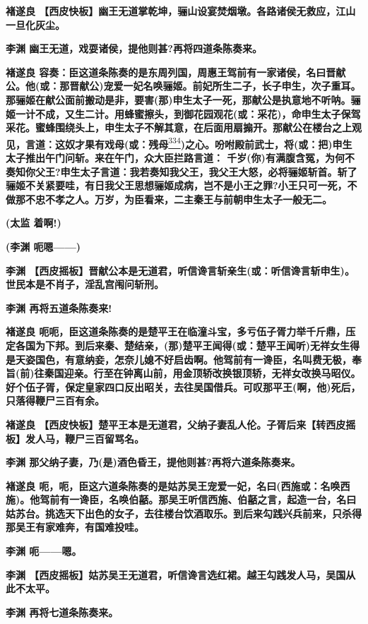 \textbf{褚遂良
【西皮快板】幽王无道掌乾坤，骊山设宴焚烟墩。各路诸侯无救应，江山一旦化灰尘。}

\textbf{李渊 幽王无道，戏耍诸侯，提他则甚?再将四道条陈奏来。}

\textbf{褚遂良
容奏：臣这道条陈奏的是东周列国，周惠王驾前有一家诸侯，名曰晋献公。他(或：那晋献公)宠爱一妃名唤骊姬。前妃所生二子，长子申生，次子重耳。那骊姬在献公面前搬动是非，要害(那)申生太子一死，那献公是执意地不听呐。骊姬一计不成，又生二计。用蜂蜜擦头，到御花园观花(或：采花)，命申生太子保驾采花。蜜蜂围绕头上，申生太子不解其意，在后面用扇搧开。那献公在楼台之上观见，言道：这奴才果有戏母(或：残母}\protect\hyperlink{fn334}{\textsuperscript{334}}\textbf{)之心。吩咐殿前武士，将(或：把)申生太子推出午门问斩。来在午门，众大臣拦路言道：
千岁(你)有满腹含冤，为何不奏知你父王?申生太子言道：我若奏知我父王，我父王大怒，必将骊姬斩首。斩了骊姬不关紧要哇，有日我父王思想骊姬成病，岂不是小王之罪?小王只可一死，不做那不忠不孝之人。万岁，为臣看来，二主秦王与前朝申生太子一般无二。}

\textbf{(太监 着啊!)}

\textbf{(李渊 呃嗯------)}

\textbf{李渊
【西皮摇板】晋献公本是无道君，听信谗言斩亲生(或：听信谗言斩申生)。世民本是不肖子，淫乱宫闱问斩刑。}

\textbf{李渊 再将五道条陈奏来!}

\textbf{褚遂良
呃呃，臣这道条陈奏的是楚平王在临潼斗宝，多亏伍子胥力举千斤鼎，压定各国为下邦。到后来秦、楚结亲，(那)楚平王闻得(或：楚平王闻听)无祥女生得是天姿国色，有意纳妾，怎奈儿媳不好启齿啊。他驾前有一谗臣，名叫费无极，奉旨(前)往秦国迎亲。行至在钟离山前，用金顶轿改换银顶轿，无祥女改换马昭仪。好个伍子胥，保定皇家四口反出昭关，去往吴国借兵。可叹那平王(啊，他)死后，只落得鞭尸三百有余。}

\textbf{褚遂良
【西皮快板】楚平王本是无道君，父纳子妻乱人伦。子胥后来【转西皮摇板】发人马，鞭尸三百留骂名。}

\textbf{李渊 那父纳子妻，乃(是)酒色昏王，提他则甚?再将六道条陈奏来。}

\textbf{褚遂良
呃，呃，臣这六道条陈奏的是姑苏吴王宠爱一妃，名曰(西施或：名唤西施)。他驾前有一谗臣，名唤伯嚭。那吴王听信西施、伯嚭之言，起造一台，名曰姑苏台。挑选天下出色的女子，去往楼台饮酒取乐。到后来勾践兴兵前来，只杀得那吴王有家难奔，有国难投哇。}

\textbf{李渊 呃------嗯。}

\textbf{李渊
【西皮摇板】姑苏吴王无道君，听信谗言选红裙。越王勾践发人马，吴国从此不太平。}

\textbf{李渊 再将七道条陈奏来。}

